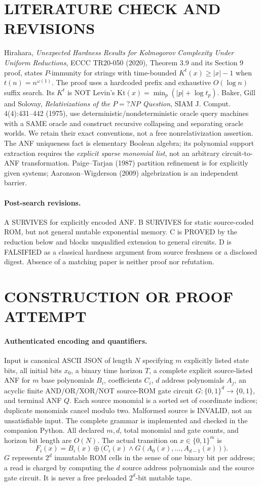 \documentclass[11pt]{article}
\begin{document}
\section{LITERATURE CHECK AND REVISIONS}
Hirahara, \emph{Unexpected Hardness Results for Kolmogorov Complexity Under Uniform Reductions}, ECCC TR20-050 (2020), Theorem 3.9 and its Section 9 proof, states $P$-immunity for strings with time-bounded $K^t(x)\ge |x|-1$ when $t(n)=n^{\omega(1)}$. The proof uses a hardcoded prefix and exhaustive $O(\log n)$ suffix search. Its $K^t$ is NOT Levin's $\mathrm{Kt}(x)=\min_p(|p|+\log t_p)$. Baker, Gill and Solovay, \emph{Relativizations of the $P=?NP$ Question}, SIAM J. Comput. 4(4):431--442 (1975), use deterministic/nondeterministic oracle query machines with a SAME oracle and construct recursive collapsing and separating oracle worlds. We retain their exact conventions, not a free nonrelativization assertion. The ANF uniqueness fact is elementary Boolean algebra; its polynomial support extraction requires the \emph{explicit sparse monomial list}, not an arbitrary circuit-to-ANF transformation. Paige--Tarjan (1987) partition refinement is for explicitly given systems; Aaronson--Wigderson (2009) algebrization is an independent barrier.
\paragraph{Post-search revisions.} A SURVIVES for explicitly encoded ANF. B SURVIVES for static source-coded ROM, but not general mutable exponential memory. C is PROVED by the reduction below and blocks unqualified extension to general circuits. D is FALSIFIED as a classical hardness argument from source freshness or a disclosed digest. Absence of a matching paper is neither proof nor refutation.

\section{CONSTRUCTION OR PROOF ATTEMPT}
\paragraph{Authenticated encoding and quantifiers.} Input is canonical ASCII JSON of length $N$ specifying $m$ explicitly listed state bits, all initial bits $x_0$, a binary time horizon $T$, a complete explicit source-listed ANF for $m$ base polynomials $B_i$, coefficients $C_i$, $d$ address polynomials $A_j$, an acyclic finite AND/OR/XOR/NOT source-ROM gate circuit $G:\{0,1\}^d\to\{0,1\}$, and terminal ANF $Q$. Each source monomial is a sorted set of coordinate indices; duplicate monomials cancel modulo two. Malformed source is INVALID, not an unsatisfiable input. The complete grammar is implemented and checked in the companion Python. All declared $m,d$, total monomial and gate counts, and horizon bit length are $O(N)$. The actual transition on $x\in\{0,1\}^m$ is
\[
 F_i(x)=B_i(x)\oplus\bigl(C_i(x)\wedge G(A_0(x),\ldots,A_{d-1}(x))\bigr).
\]
$G$ represents $2^d$ immutable ROM cells in the sense of one binary bit per address; a read is charged by computing the $d$ source address polynomials and the source gate circuit. It is never a free preloaded $2^d$-bit mutable tape.
\end{document}
